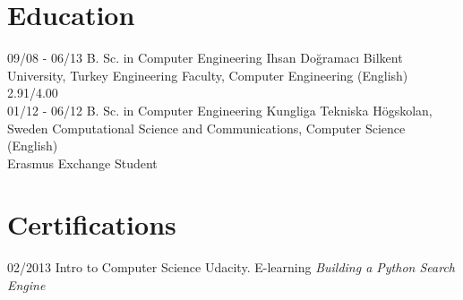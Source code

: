 \documentclass[]{friggeri-cv}
\begin{document}
\section{Education}
\begin{entrylist}
  \entry
    {09/08 - 06/13}
    {B. Sc. in Computer Engineering}
    {Ihsan Doğramacı Bilkent University, Turkey}
    {Engineering Faculty, Computer Engineering (English)\\
    2.91/4.00 \\}
    \entry
    {01/12 - 06/12}
    {B. Sc. in Computer Engineering}
    {Kungliga Tekniska Högskolan, Sweden }
    {Computational Science and Communications, Computer Science (English)\\
    Erasmus Exchange Student \\}

\end{entrylist}

\section{Certifications}
\begin{entrylist}
  \entry
    {02/2013}
    {Intro to Computer Science}
    {Udacity. E-learning}
    {\emph{Building a Python Search Engine}}
\end{entrylist}

\newpage
\end{document}
